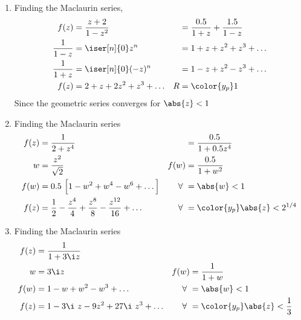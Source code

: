 \begin{enumerate}
    \item Finding the Maclaurin series,
          \begin{align}
              f(z)          & = \frac{z+2}{1 - z^2}               &
                            & = \frac{0.5}{1+z} + \frac{1.5}{1-z}   \\
              \frac{1}{1-z} & = \iser[n]{0} z^n                   &
                            & = 1 + z + z^2 + z^3 + \dots           \\
              \frac{1}{1+z} & = \iser[n]{0} (-z)^n                &
                            & = 1 - z + z^2 - z^3 + \dots           \\
              f(z)          & = 2 + z + 2z^2 + z^3 + \dots        &
              R             & = \color{y_p} 1
          \end{align}
          Since the geometric series converges for $ \abs{z} < 1$

    \item Finding the Maclaurin series
          \begin{align}
              f(z)      & = \frac{1}{2 + z^4}                             &
                        & = \frac{0.5}{1 + 0.5z^4}                          \\
              w         & = \frac{z^2}{\sqrt{2}}                          &
              f(w)      & = \frac{0.5}{1 + w^2}                             \\
              f(w)      & = 0.5\ \Big[ 1 - w^2 + w^4 - w^6 + \dots \Big]  &
              \forall\  & = \abs{w} < 1                                     \\
              f(z)      & = \frac{1}{2} - \frac{z^4}{4} + \frac{z^8}{8} -
              \frac{z^{12}}{16} +
              \dots     &
              \forall\  & = \color{y_p} \abs{z} < 2^{1/4}
          \end{align}

    \item Finding the Maclaurin series
          \begin{align}
              f(z)      & = \frac{1}{1 + 3\i z}                 \\
              w         & = 3\i z                             &
              f(w)      & = \frac{1}{1 + w}                     \\
              f(w)      & = 1 - w + w^2 - w^3 + \dots         &
              \forall\  & = \abs{w} < 1                         \\
              f(z)      & = 1 - 3\i\ z - 9z^2 + 27\i\ z^3 +
              \dots     &
              \forall\  & = \color{y_p} \abs{z} < \frac{1}{3}
          \end{align}


\end{enumerate}

